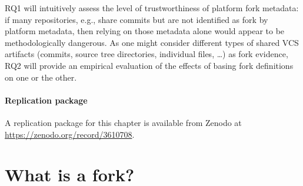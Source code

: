 
\vspace{1em}

\noindent{}

\vspace{1em}

\noindent{}

\vspace{1em}

RQ1 will intuitively assess the level of trustworthiness of platform fork
metadata: if many repositories, e.g., share commits but are not identified as
fork by platform metadata, then relying on those metadata alone would appear to
be methodologically dangerous. As one might consider different types of shared
VCS artifacts (commits, source tree directories, individual files, \ldots) as
fork evidence, RQ2 will provide an empirical evaluation of the effects of
basing fork definitions on one or the other.


\paragraph{Replication package}
A replication package for this chapter is available from Zenodo at
\url{https://zenodo.org/record/3610708}.


\section{What is a fork?}
\label{sec:forks-defs}


